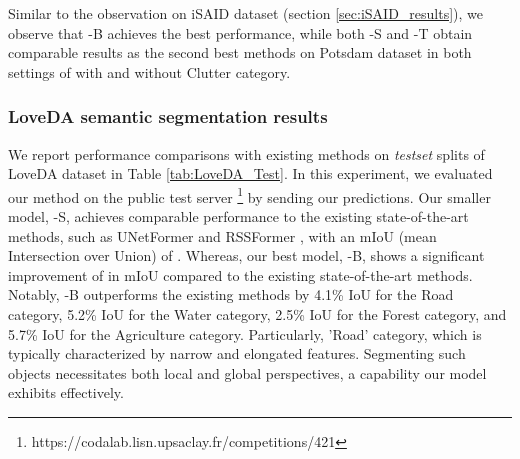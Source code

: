 \documentclass[journal]{IEEEtran}
\begin{document}
Similar to the observation on iSAID dataset (section \ref{sec:iSAID_results}), we observe that \model-B achieves the best performance, while both \model-S and \model-T obtain comparable results as the second best methods on Potsdam dataset in both settings of with and without Clutter category.  


\subsubsection{\textbf{LoveDA semantic segmentation results}} We report performance comparisons with existing methods on \textit{testset} splits of LoveDA dataset in Table \ref{tab:LoveDA_Test}.
In this experiment, we evaluated our method on the public test server \footnote{https://codalab.lisn.upsaclay.fr/competitions/421} by sending our predictions.  Our smaller model, \model-S, achieves comparable performance to the existing state-of-the-art methods, such as UNetFormer \cite{wang2022unetformer} and RSSFormer \cite{xu2023rssformer}, with an mIoU (mean Intersection over Union) of . Whereas, our best model, \model-B, shows a significant improvement of  in mIoU compared to the existing state-of-the-art methods. Notably, \model-B outperforms the existing methods by 4.1\% IoU for the Road category, 5.2\% IoU for the Water category, 2.5\% IoU for the Forest category, and 5.7\% IoU for the Agriculture category. Particularly, 'Road' category, which is typically characterized by narrow and elongated features. Segmenting such objects necessitates both local and global perspectives, a capability our model exhibits effectively.
\end{document}
